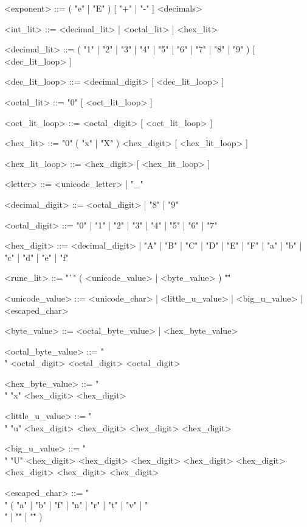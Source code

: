 \begin{grammar}
    <exponent>          ::=     ( "e" | "E" ) [ "+" | "-" ] <decimals>

    <int_lit>           ::=     <decimal_lit> | <octal_lit> | <hex_lit>

    <decimal_lit>       ::=     ( "1" | "2" | "3" | "4" | "5" | "6" | "7" | "8" | "9" ) [ <dec_lit_loop> ]

    <dec_lit_loop>      ::=     <decimal_digit> [ <dec_lit_loop> ]

    <octal_lit>         ::=     "0" [ <oct_lit_loop> ]

    <oct_lit_loop>      ::=     <octal_digit> [ <oct_lit_loop> ]

    <hex_lit>           ::=     "0" ( "x" | "X" ) <hex_digit> [ <hex_lit_loop> ]

    <hex_lit_loop>      ::=     <hex_digit> [ <hex_lit_loop> ]

    <letter>            ::=     <unicode_letter> | "_"

    <decimal_digit>     ::=     <octal_digit> | "8" | "9"

    <octal_digit>       ::=     "0" | "1" | "2" | "3" | "4" | "5" | "6" | "7"

    <hex_digit>         ::=     <decimal_digit> | "A" | "B" | "C" | "D" | "E" | "F" | "a" | "b" | "c" | "d" | "e" | "f"

    <rune_lit>          ::=     "`" ( <unicode_value> | <byte_value> ) "\""

    <unicode_value>     ::=     <unicode_char> | <little_u_value> | <big_u_value> | <escaped_char>

    <byte_value>        ::=     <octal_byte_value> | <hex_byte_value>

    <octal_byte_value>  ::=     "\\" <octal_digit> <octal_digit> <octal_digit>

    <hex_byte_value>    ::=     "\\" "x" <hex_digit> <hex_digit>

    <little_u_value>    ::=     "\\" "u" <hex_digit> <hex_digit> <hex_digit> <hex_digit>

    <big_u_value>       ::=     "\\" "U" <hex_digit> <hex_digit> <hex_digit> <hex_digit> <hex_digit> <hex_digit> <hex_digit> <hex_digit>

    <escaped_char>      ::=     "\\" ( "a" | "b" | "f" | "n" | "r" | "t" | "v" | "\\" | "\'" | "\"" )

\end{grammar}